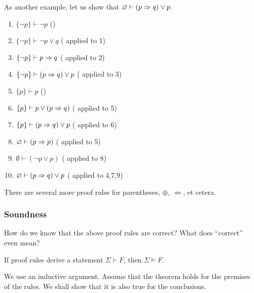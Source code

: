 As another example, let us show that $\varnothing\vdash(p\Rightarrow q)\vee p$.
\begin{enumerate}
    \item $\{\neg p\}\vdash\neg p$ \hfill ()
    \item $\{\neg p\}\vdash \neg p \vee q$ \hfill ( applied to 1)
    \item $\{\neg p\}\vdash p \Rightarrow q$ \hfill ( applied to 2)
    \item $\{\neg p\}\vdash (p \Rightarrow q)\vee p$ \hfill ( applied to 3)

    \item $\{p\}\vdash p$ \hfill ()
    \item $\{p\}\vdash p\vee(p\Rightarrow q)$ \hfill ( applied to 5)
    \item $\{p\}\vdash (p\Rightarrow q)\vee p$ \hfill ( applied to 6)

    \item $\varnothing\vdash (p\Rightarrow p)$ \hfill ( applied to 5)
    \item $\emptyset\vdash (\neg p\vee p)$ \hfill ( applied to 8)
    
    \item $\varnothing\vdash (p\Rightarrow q)\vee p$ \hfill ( applied to 4,7,9)
\end{enumerate}

There are several more proof rules for parentheses, $\oplus$, $\iff$, et cetera.

\subsubsection{Soundness}

How do we know that the above proof rules are correct? What does ``correct'' even mean?

\begin{theorem}
\label{theo: derivation implies modeling}
    If proof rules derive a statement $\Sigma\vdash F$, then $\Sigma\vDash F$.
\end{theorem}
We use an inductive argument. Assume that the theorem holds for the premises of the rules. We shall show that it is also true for the conclusions.\\

